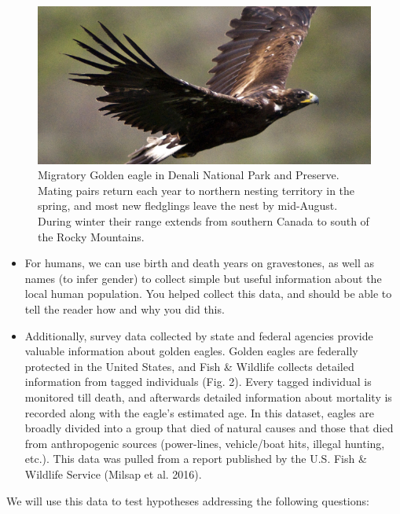 \documentclass[11pt,]{article}
\begin{document}
\begin{figure}
\centering
\includegraphics{../_chapter_materials/golden_eagle.jpg}
\caption{Migratory Golden eagle in Denali National Park and Preserve.
Mating pairs return each year to northern nesting territory in the
spring, and most new fledglings leave the nest by mid-August. During
winter their range extends from southern Canada to south of the Rocky
Mountains.}
\end{figure}

\begin{itemize}
\item
  For humans, we can use birth and death years on gravestones, as well
  as names (to infer gender) to collect simple but useful information
  about the local human population. You helped collect this data, and
  should be able to tell the reader how and why you did this.
\item
  Additionally, survey data collected by state and federal agencies
  provide valuable information about golden eagles. Golden eagles are
  federally protected in the United States, and Fish \& Wildlife
  collects detailed information from tagged individuals (Fig. 2). Every
  tagged individual is monitored till death, and afterwards detailed
  information about mortality is recorded along with the eagle's
  estimated age. In this dataset, eagles are broadly divided into a
  group that died of natural causes and those that died from
  anthropogenic sources (power-lines, vehicle/boat hits, illegal
  hunting, etc.). This data was pulled from a report published by the
  U.S. Fish \& Wildlife Service (Milsap et al. 2016).
\end{itemize}

\pagebreak

We will use this data to test hypotheses addressing the following
questions:
\end{document}
